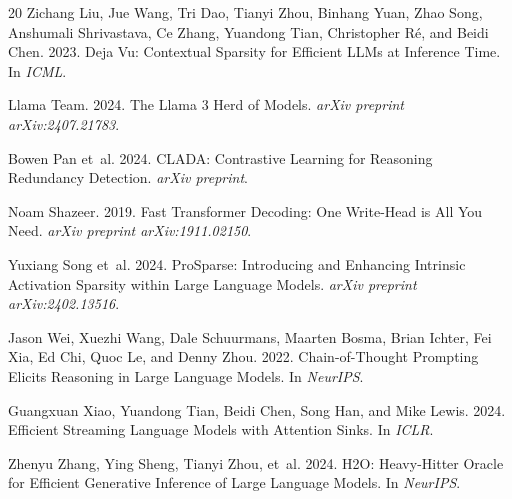 \documentclass[11pt,a4paper]{article}
\begin{document}
\begin{thebibliography}{20}
Zichang Liu, Jue Wang, Tri Dao, Tianyi Zhou, Binhang Yuan, Zhao Song, Anshumali Shrivastava, Ce Zhang, Yuandong Tian, Christopher R\'{e}, and Beidi Chen. 2023.
\newblock Deja Vu: Contextual Sparsity for Efficient LLMs at Inference Time.
\newblock In \emph{ICML}.

Llama Team. 2024.
\newblock The Llama 3 Herd of Models.
\newblock \emph{arXiv preprint arXiv:2407.21783}.

Bowen Pan et~al. 2024.
\newblock CLADA: Contrastive Learning for Reasoning Redundancy Detection.
\newblock \emph{arXiv preprint}.

Noam Shazeer. 2019.
\newblock Fast Transformer Decoding: One Write-Head is All You Need.
\newblock \emph{arXiv preprint arXiv:1911.02150}.

Yuxiang Song et~al. 2024.
\newblock ProSparse: Introducing and Enhancing Intrinsic Activation Sparsity within Large Language Models.
\newblock \emph{arXiv preprint arXiv:2402.13516}.

Jason Wei, Xuezhi Wang, Dale Schuurmans, Maarten Bosma, Brian Ichter, Fei Xia, Ed Chi, Quoc Le, and Denny Zhou. 2022.
\newblock Chain-of-Thought Prompting Elicits Reasoning in Large Language Models.
\newblock In \emph{NeurIPS}.

Guangxuan Xiao, Yuandong Tian, Beidi Chen, Song Han, and Mike Lewis. 2024.
\newblock Efficient Streaming Language Models with Attention Sinks.
\newblock In \emph{ICLR}.

Zhenyu Zhang, Ying Sheng, Tianyi Zhou, et~al. 2024.
\newblock H2O: Heavy-Hitter Oracle for Efficient Generative Inference of Large Language Models.
\newblock In \emph{NeurIPS}.

\end{thebibliography}
\end{document}
